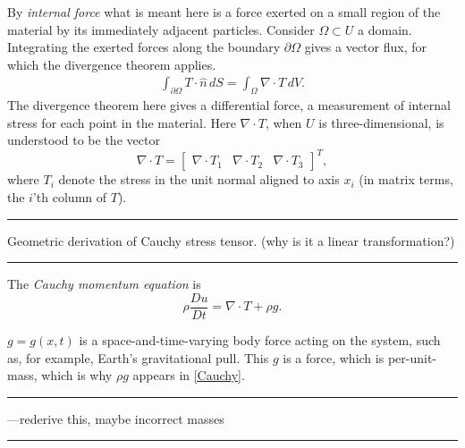 \documentclass{article}
\newcommand{\bb}{\begin{bmatrix}}
\newcommand{\bbe}{\end{bmatrix}}
\newcommand{\todo}[1]{\vskip 0.1in \hrule \vskip 0.03in {#1} \vskip 0.03in \hrule \vskip 0.1in}
\begin{document}
By \textit{internal force} what is meant here is a force exerted on a small region of the material by its immediately adjacent particles.
Consider $\Omega \subset U$ a domain. Integrating the exerted forces along the boundary $\partial\Omega$ gives a vector flux, for which the divergence
theorem applies.
\begin{equation}\label{TDiv}
\begin{split}
    \int_{\partial\Omega} T \cdot \hat{n}\, dS
         = \int_\Omega \nabla \cdot T\, dV.
\end{split}
\end{equation}
The divergence theorem here gives a differential force, a measurement of internal stress for each point in the material.
Here $\nabla \cdot T$, when $U$ is three-dimensional, is understood to be the vector
    $$\nabla \cdot T = \bb \nabla \cdot T_1 & \nabla \cdot T_2 & \nabla \cdot T_3 \bbe^T,$$
where $T_i$ denote the stress in the unit normal aligned to axis $x_i$ (in matrix terms, the $i$'th column of $T$).



\todo{Geometric derivation of Cauchy stress tensor. (why is it a linear transformation?)}


The \textit{Cauchy momentum equation} is
\begin{equation}\label{Cauchy}
    \rho \frac{Du}{Dt} = \nabla \cdot T + \rho g.
\end{equation}

$g = g(x, t)$ is a space-and-time-varying body force acting
on the system, such as, for example, Earth's gravitational pull.
This $g$ is a force, which is per-unit-mass, which is why
$\rho g$ appears in \eqref{Cauchy}.
\todo{---rederive this, maybe incorrect masses}
\end{document}
